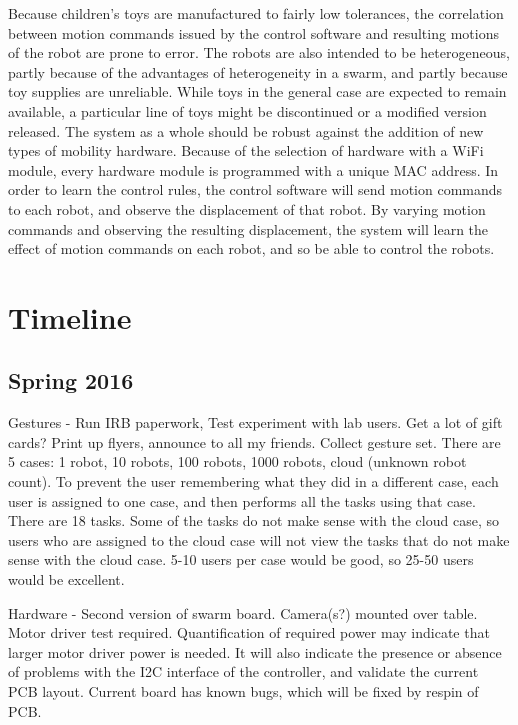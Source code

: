 \documentclass[]{article}
\begin{document}
Because children's toys are manufactured to fairly low tolerances, the correlation between motion commands issued by the control software and resulting motions of the robot are prone to error. 
The robots are also intended to be heterogeneous, partly because of the advantages of heterogeneity in a swarm, and partly because toy supplies are unreliable.
While toys in the general case are expected to remain available, a particular line of toys might be discontinued or a modified version released. 
The system as a whole should be robust against the addition of new types of mobility hardware. 
Because of the selection of hardware with a WiFi module, every hardware module is programmed with a unique MAC address. 
In order to learn the control rules, the control software will send motion commands to each robot, and observe the displacement of that robot. 
By varying motion commands and observing the resulting displacement, the system will learn the effect of motion commands on each robot, and so be able to control the robots. 

\section{Timeline}

\subsection{Spring 2016}

Gestures - Run IRB paperwork, Test experiment with lab users. Get a lot of gift cards? Print up flyers, announce to all my friends. Collect gesture set. 
There are 5 cases: 1 robot, 10 robots, 100 robots, 1000 robots, cloud (unknown robot count). 
To prevent the user remembering what they did in a different case, each user is assigned to one case, and then performs all the tasks using that case. 
There are 18 tasks. 
Some of the tasks do not make sense with the cloud case, so users who are assigned to the cloud case will not view the tasks that do not make sense with the cloud case. 
5-10 users per case would be good, so 25-50 users would be excellent. 

Hardware - Second version of swarm board. 
Camera(s?) mounted over table. 
Motor driver test required. 
Quantification of required power may indicate that larger motor driver power is needed.
It will also indicate the presence or absence of problems with the I2C interface of the controller, and validate the current PCB layout. 
Current board has known bugs, which will be fixed by respin of PCB. 
\end{document}
